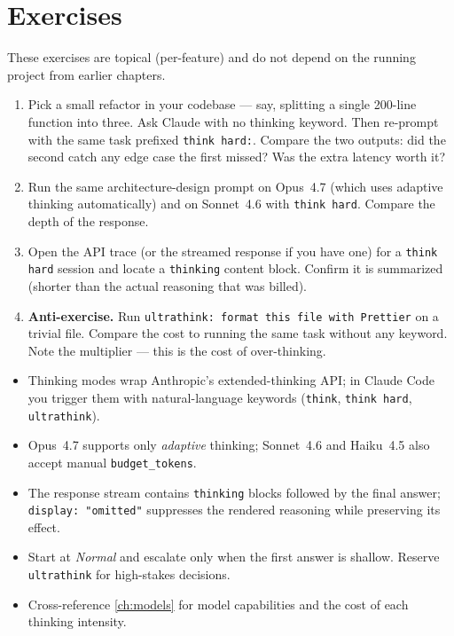 \section{Exercises}
\label{sec:thinking-exercises}

\begin{exercisebox}
These exercises are topical (per-feature) and do not depend on the
running project from earlier chapters.

\begin{enumerate}
  \item Pick a small refactor in your codebase — say, splitting a
        single 200-line function into three. Ask Claude with no
        thinking keyword. Then re-prompt with the same task prefixed
        \texttt{think hard:}. Compare the two outputs: did the second
        catch any edge case the first missed? Was the extra latency
        worth it?
  \item Run the same architecture-design prompt on Opus~4.7 (which uses
        adaptive thinking automatically) and on Sonnet~4.6 with
        \texttt{think hard}. Compare the depth of the response.
  \item Open the API trace (or the streamed response if you have one)
        for a \texttt{think hard} session and locate a
        \texttt{thinking} content block. Confirm it is summarized
        (shorter than the actual reasoning that was billed).
  \item \textbf{Anti-exercise.} Run \texttt{ultrathink: format this
        file with Prettier} on a trivial file. Compare the cost to
        running the same task without any keyword. Note the multiplier
        — this is the cost of over-thinking.
\end{enumerate}
\end{exercisebox}

\begin{summarybox}
\begin{itemize}
  \item Thinking modes wrap Anthropic's extended-thinking API; in Claude
        Code you trigger them with natural-language keywords
        (\texttt{think}, \texttt{think hard}, \texttt{ultrathink}).
  \item Opus~4.7 supports only \emph{adaptive} thinking; Sonnet~4.6 and
        Haiku~4.5 also accept manual \texttt{budget\_tokens}.
  \item The response stream contains \texttt{thinking} blocks followed by
        the final answer; \texttt{display: "omitted"} suppresses the
        rendered reasoning while preserving its effect.
  \item Start at \emph{Normal} and escalate only when the first answer is
        shallow. Reserve \texttt{ultrathink} for high-stakes decisions.
  \item Cross-reference \cref{ch:models} for model capabilities and the
        cost of each thinking intensity.
\end{itemize}
\end{summarybox}

\nocite{*}
\printbibliography[heading=subbibliography,title={References}]
